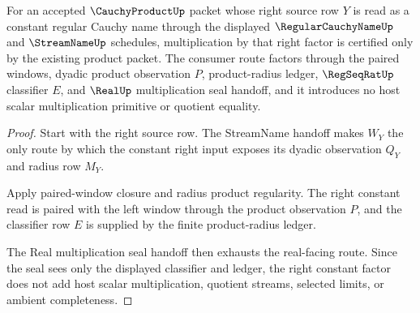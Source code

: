 \begin{theorem}
\label{thm:cauchy-product-constant-right-factor}
For an accepted $\CauchyProductUp$ packet whose right source row $Y$ is read as a constant regular Cauchy name through the displayed $\RegularCauchyNameUp$ and $\StreamNameUp$ schedules, multiplication by that right factor is certified only by the existing product packet. The consumer route factors through the paired windows, dyadic product observation $P$, product-radius ledger, $\RegSeqRatUp$ classifier $E$, and $\RealUp$ multiplication seal handoff, and it introduces no host scalar multiplication primitive or quotient equality.
\end{theorem}
\begin{proof}
Start with the right source row. The StreamName handoff makes $W_Y$ the only route by which the constant right input exposes its dyadic observation $Q_Y$ and radius row $M_Y$.

Apply paired-window closure and radius product regularity. The right constant read is paired with the left window through the product observation $P$, and the classifier row $E$ is supplied by the finite product-radius ledger.

The Real multiplication seal handoff then exhausts the real-facing route. Since the seal sees only the displayed classifier and ledger, the right constant factor does not add host scalar multiplication, quotient streams, selected limits, or ambient completeness.
\end{proof}

